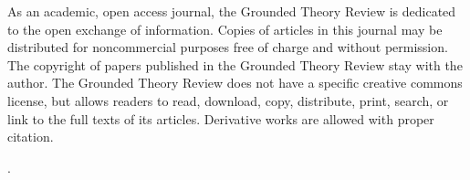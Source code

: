 As an academic, open access journal,
the Grounded Theory Review is dedicated to the open exchange of information.
Copies of articles in this journal may be distributed for noncommercial purposes
free of charge and without permission.
The copyright of papers published in the Grounded Theory Review stay with the author.
The Grounded Theory Review does not have a specific creative commons license,
but allows readers to read, download, copy, distribute, print, search,
or link to the full texts of its articles.  Derivative works are allowed with proper citation.

\nocite{article.cynthia10}.



